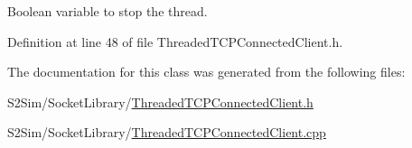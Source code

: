 Boolean variable to stop the thread. 



Definition at line 48 of file Threaded\-T\-C\-P\-Connected\-Client.\-h.



The documentation for this class was generated from the following files\-:\begin{DoxyCompactItemize}
\item 
S2\-Sim/\-Socket\-Library/\hyperlink{_threaded_t_c_p_connected_client_8h}{Threaded\-T\-C\-P\-Connected\-Client.\-h}\item 
S2\-Sim/\-Socket\-Library/\hyperlink{_threaded_t_c_p_connected_client_8cpp}{Threaded\-T\-C\-P\-Connected\-Client.\-cpp}\end{DoxyCompactItemize}
